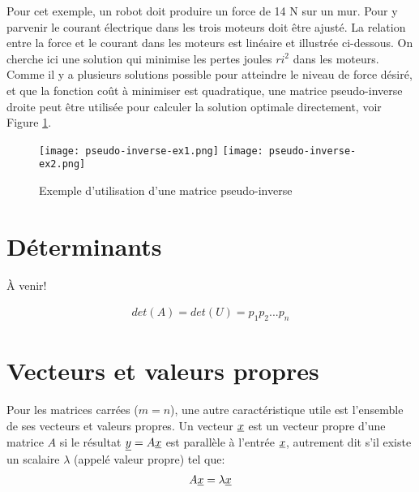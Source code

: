 \begin{example}
Pour cet exemple, un robot doit produire un force de 14 N sur un mur. Pour y parvenir le courant électrique dans les trois moteurs doit être ajusté. La relation entre la force et le courant dans les moteurs est linéaire et illustrée ci-dessous. On cherche ici une solution qui minimise les pertes joules $ri^2$ dans les moteurs. Comme il y a plusieurs solutions possible pour atteindre le niveau de force désiré, et que la fonction coût à minimiser est quadratique, une matrice pseudo-inverse droite peut être utilisée pour calculer la solution optimale directement, voir Figure \ref{fig:pseudo-inverse-ex1}.
\begin{figure}[H]
	\centering
		\texttt{[image: pseudo-inverse-ex1.png]}
		\texttt{[image: pseudo-inverse-ex2.png]}
	\caption{Exemple d'utilisation d'une matrice pseudo-inverse}
	\label{fig:pseudo-inverse-ex1}
\end{figure}
\end{example}



\newpage
\section{Déterminants}

À venir!

\begin{align}
det(A) = det(U) = p_1 p_2 ... p_n
\end{align}

\newpage
\section{Vecteurs et valeurs propres}

Pour les matrices carrées ($m=n$), une autre caractéristique utile est l'ensemble de ses vecteurs et valeurs propres. Un vecteur $\underline{x}$ est un vecteur propre d'une matrice $A$ si le résultat $\underline{y} = A \underline{x}$ est parallèle à l'entrée $\underline{x}$, autrement dit s'il existe un scalaire $\lambda$ (appelé valeur propre) tel que:
\begin{align}
A \underline{x} = \lambda  \underline{x}
\end{align}

